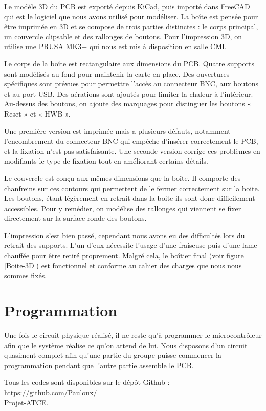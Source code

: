 \documentclass[12pt, a4paper, titlepage]{article}
\begin{document}
Le modèle 3D du PCB est exporté depuis KiCad, puis importé dans FreeCAD qui est le logiciel que nous avons utilisé pour modéliser. La boîte est pensée pour être imprimée en 3D et se compose de trois parties distinctes : le corps principal, un couvercle clipsable et des rallonges de boutons. Pour l'impression 3D, on utilise une PRUSA MK3+ qui nous est mis à disposition en salle CMI.

Le corps de la boîte est rectangulaire aux dimensions du PCB. Quatre supports sont modélisés au fond pour maintenir la carte en place. Des ouvertures spécifiques sont prévues pour permettre l’accès au connecteur BNC, aux boutons et au port USB. Des aérations sont ajoutés pour limiter la chaleur à l'intérieur. Au-dessus des boutons, on ajoute des marquages pour distinguer les boutons « Reset » et « HWB ».

Une première version est imprimée mais a plusieurs défauts, notamment l’encombrement du connecteur BNC qui empêche d’insérer correctement le PCB, et la fixation n’est pas satisfaisante. Une seconde version corrige ces problèmes en modifiants le type de fixation tout en améliorant certains détails.

Le couvercle est conçu aux mêmes dimensions que la boîte. Il comporte des chanfreins sur ces contours qui permettent de le fermer correctement sur la boite. Les boutons, étant légèrement en retrait dans la boite ils sont donc difficilement accessibles. Pour y remédier, on modélise des rallonges qui viennent se fixer directement sur la surface ronde des boutons.

L’impression s'est bien passé, cependant nous avons eu des difficultés lors du retrait des supports. L’un d’eux nécessite l’usage d’une fraiseuse puis d’une lame chauffée pour être retiré proprement. Malgré cela, le boîtier final (voir figure \ref{Boite-3D}) est fonctionnel et conforme au cahier des charges que nous nous sommes fixés.

\section{Programmation}

Une fois le circuit physique réalisé, il ne reste qu'à programmer le microcontrôleur afin que le système réalise ce qu'on attend de lui. Nous disposons d'un circuit quasiment complet afin qu'une partie du groupe puisse commencer la programmation pendant que l'autre partie assemble le PCB.

Tous les codes sont disponibles sur le dépôt Github : \href{https://github.com/Pauloux/Projet-ATCE}{https://github.com/Pauloux/ \\ Projet-ATCE}.
\end{document}
